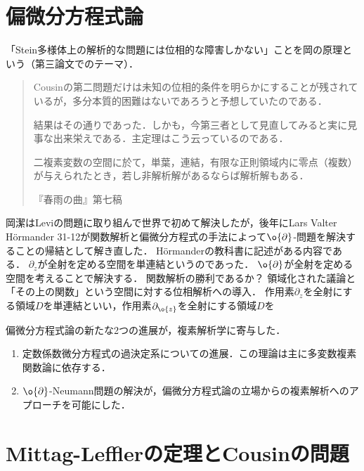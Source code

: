 \documentclass[uplatex, dvipdfmx]{jsreport}
\begin{document}
\section{偏微分方程式論}

\begin{history}[岡潔]
    「Stein多様体上の解析的な問題には位相的な障害しかない」ことを岡の原理という（第三論文でのテーマ）．
    \begin{quote}
        Cousinの第二問題だけは未知の位相的条件を明らかにすることが残されているが，多分本質的困難はないであろうと予想していたのである．

        結果はその通りであった．しかも，今第三者として見直してみると実に見事な出来栄えである．主定理はこう云っているのである．

        二複素変数の空間に於て，単葉，連結，有限な正則領域内に零点（複数）が与えられたとき，若し非解析解があるならば解析解もある．
        
        『春雨の曲』第七稿
    \end{quote}
    岡潔はLeviの問題に取り組んで世界で初めて解決したが，後年にLars Valter Hörmander 31-12が関数解析と偏微分方程式の手法によって$\o{\partial}$-問題を解決することの帰結として解き直した．
    Hörmanderの教科書に記述がある内容である．
    $\partial_z$が全射を定める空間を単連結というのであった．
    $\o{\partial}$が全射を定める空間を考えることで解決する．
    関数解析の勝利であるか？
    領域化された議論と「その上の関数」という空間に対する位相解析への導入．
    作用素$\partial_z$を全射にする領域$D$を単連結といい，作用素$\partial_{\o{z}}$を全射にする領域$D$を
\end{history}

\begin{history}[Hormander]
    偏微分方程式論の新たな2つの進展が，複素解析学に寄与した．
    \begin{enumerate}
        \item 定数係数微分方程式の過決定系についての進展．この理論は主に多変数複素関数論に依存する．
        \item $\o{\partial}$-Neumann問題の解決が，偏微分方程式論の立場からの複素解析へのアプローチを可能にした．
    \end{enumerate}
\end{history}

\section{Mittag-Lefflerの定理とCousinの問題}
\end{document}
